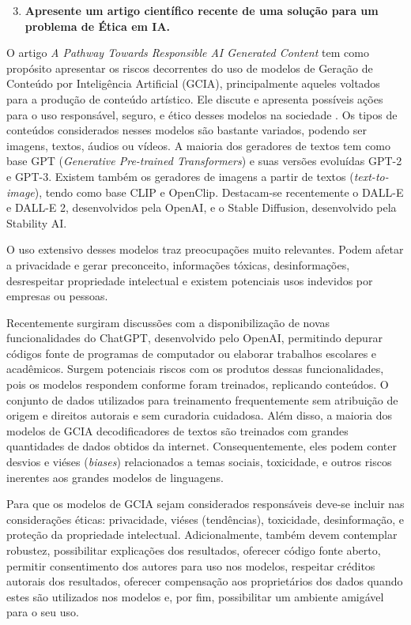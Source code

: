 \begin{enumerate}\setcounter{enumi}{2}\bfseries
    \item  \textbf{Apresente um artigo científico recente de uma solução para um problema de Ética em IA.}
\end{enumerate}

O artigo \textit{A Pathway Towards Responsible AI Generated Content} tem como propósito apresentar 
os riscos decorrentes do uso de modelos de Geração de Conteúdo por Inteligência Artificial (GCIA), 
principalmente aqueles voltados para a produção de conteúdo artístico. 
Ele discute e apresenta possíveis ações para o uso responsável, seguro, e ético desses modelos na 
sociedade \cite{chen2023pathway}.
Os tipos de conteúdos considerados nesses modelos são bastante variados, podendo ser imagens, textos, 
áudios ou vídeos. A maioria dos geradores de textos tem como base GPT
(\textit{Generative Pre-trained Transformers}) e suas versões evoluídas GPT-2 e GPT-3. 
Existem também os geradores de imagens a partir de textos (\textit{text-to-image}), tendo  
como base CLIP e OpenClip. Destacam-se 
recentemente o DALL-E e DALL-E 2, desenvolvidos pela OpenAI, e o Stable Diffusion, desenvolvido pela 
Stability AI.

O uso extensivo desses modelos traz preocupações muito relevantes. Podem afetar a privacidade e
gerar preconceito, informações tóxicas, desinformações, desrespeitar propriedade intelectual e 
existem potenciais usos indevidos por empresas ou pessoas. 

Recentemente surgiram discussões com a disponibilização de novas funcionalidades do ChatGPT, desenvolvido 
pelo OpenAI, permitindo depurar códigos fonte de programas de 
computador ou elaborar trabalhos escolares e acadêmicos. Surgem potenciais riscos com os produtos dessas funcionalidades, 
pois os modelos respondem conforme foram treinados, replicando conteúdos.
O conjunto de dados utilizados para treinamento frequentemente sem atribuição de origem e direitos autorais e sem curadoria cuidadosa. 
Além disso, a maioria dos modelos de GCIA decodificadores de textos são treinados com grandes quantidades 
de dados obtidos da internet. Consequentemente, eles podem conter desvios e viéses (\textit{biases}) relacionados a temas sociais, toxicidade, 
e outros riscos inerentes aos grandes modelos de linguagens.

Para que os modelos de GCIA sejam considerados responsáveis deve-se incluir nas considerações éticas: 
privacidade, viéses (tendências), toxicidade, desinformação, e proteção da propriedade intelectual. 
Adicionalmente, também devem contemplar robustez, possibilitar explicações dos resultados,
oferecer código fonte aberto, permitir consentimento dos autores para uso nos modelos, 
respeitar créditos autorais dos resultados, oferecer compensação aos proprietários dos dados quando 
estes são utilizados nos modelos e, por fim, possibilitar um ambiente amigável para o seu uso.

